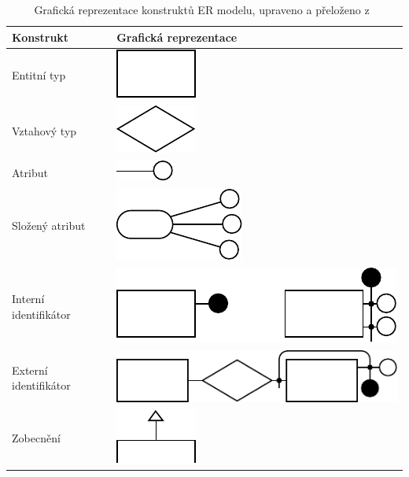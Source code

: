 \begin{table}[!htb]
  \centering
  \begin{tabular}{@{}m{4cm}m{7cm}@{}} \toprule
    Konstrukt & Grafická reprezentace \\ \midrule
    Entitní typ & {\centering\includegraphics{../img/er-model/entity.pdf}} \\
    Vztahový typ & \includegraphics{../img/er-model/relationship.pdf} \\
    Atribut & \includegraphics{../img/er-model/attribute.pdf} \\
    Složený atribut & \includegraphics{../img/er-model/composite-attribute.pdf} \\
    Interní identifikátor & \includegraphics{../img/er-model/identifier.pdf} \\
    Externí identifikátor & \includegraphics{../img/er-model/external-identifier.pdf} \\
    Zobecnění & \includegraphics{../img/er-model/generalization.pdf} \\ \bottomrule
  \end{tabular}
  \caption{Grafická reprezentace konstruktů ER modelu, upraveno a přeloženo z~\cite[s.~164]{atzeni_database_1999}}
  \label{tab:er-constructs}
\end{table}

